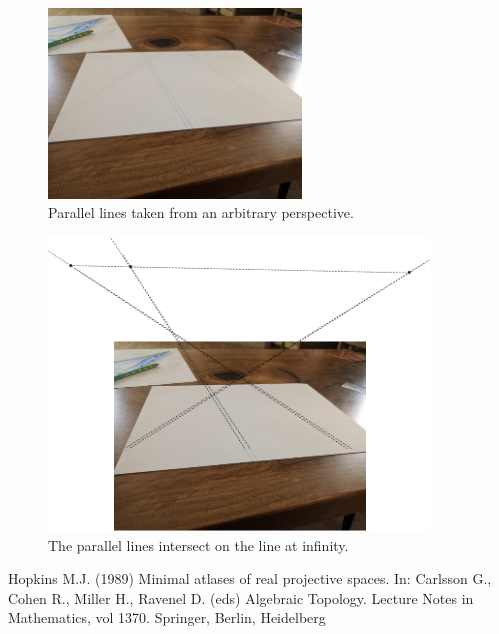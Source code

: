 \documentclass[a4paper,10pt]{article}
\begin{document}
\begin{figure}[h]
\centering
 \includegraphics[width=0.6\textwidth]{../../images/parallel.jpg}
 \caption{Parallel lines taken from an arbitrary perspective. }
 \label{fig:3dcart}
\end{figure}

\begin{figure}[h]
\centering
 \includegraphics[width=0.9\textwidth]{../../images/parallel.png}
 \caption{The parallel lines intersect on the line at infinity. }
 \label{fig:drawed}
\end{figure}

\begin{thebibliography}{1}
 Hopkins M.J. (1989) Minimal atlases of real projective spaces. In: Carlsson G., Cohen R., Miller H., Ravenel D. (eds) Algebraic Topology. Lecture Notes in Mathematics, vol 1370. Springer, Berlin, Heidelberg
\end{thebibliography}
\end{document}
